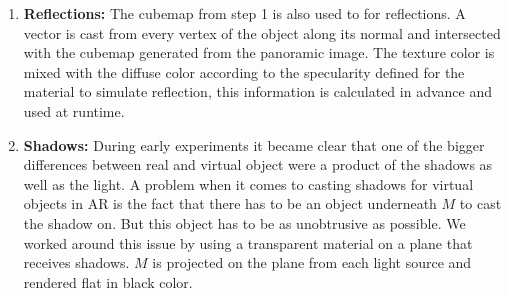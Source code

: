 \begin{enumerate}
 \item \textbf{Reflections:} The cubemap from step 1 is also used to for reflections. A vector is cast from every vertex of the object along its normal and intersected with the cubemap generated from the panoramic image. The texture color is mixed with the diffuse color according to the specularity defined for the material to simulate reflection, this information is calculated in advance and used at runtime. 
 
 \item \textbf{Shadows:} During early experiments it became clear that one of the bigger differences between real and virtual object were a product of the shadows as well as the light. A problem when it comes to casting shadows for virtual objects in AR is the fact that there has to be an object underneath $M$ to cast the shadow on. But this object has to be as unobtrusive as possible. We worked around this issue by using a transparent material on a plane that receives shadows. $M$ is projected on the plane from each light source and rendered flat in black color.
 
\end{enumerate}